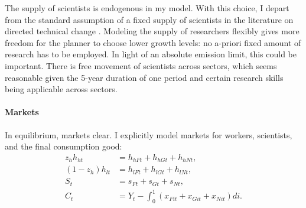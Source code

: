 The supply of scientists is endogenous in my model. With this choice, I depart from the standard assumption of a fixed supply of scientists in the literature on directed technical change \citep{Acemoglu2012TheChange, Fried2018ClimateAnalysis}.  Modeling the supply of researchers flexibly gives more freedom for the planner to choose lower growth levels: no a-priori fixed amount of research has to be employed. In light of an absolute emission limit, this could be important.
There is free movement of scientists across sectors, which seems reasonable given the 5-year duration of one period and certain research skills being applicable across sectors. %








  
\paragraph{Markets}
In equilibrium, markets clear. I explicitly model markets for workers, scientists, and the final consumption good:
\begin{align*}
z_h h_{ht}&=h_{hFt}+h_{hGt}+h_{hNt},\\
(1-z_h) h_{lt}&=h_{lFt}+h_{lGt}+h_{lNt},\\
S_t&=s_{Ft}+s_{Gt}+s_{Nt},\\
C_t&=Y_t-\int_{0}^{1}\left(x_{Fit}+x_{Git}+x_{Nit}\right)di.  %
\end{align*}

